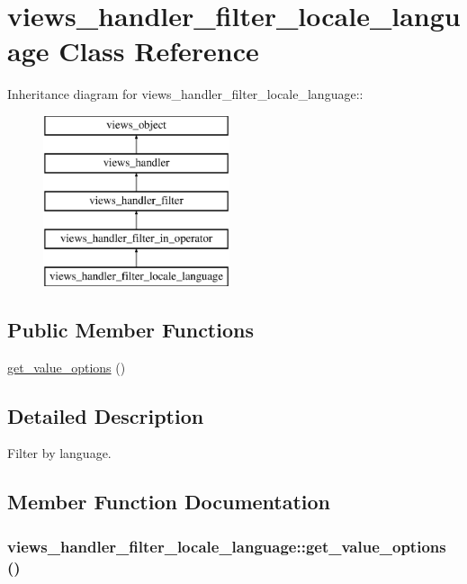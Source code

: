 \hypertarget{classviews__handler__filter__locale__language}{
\section{views\_\-handler\_\-filter\_\-locale\_\-language Class Reference}
\label{classviews__handler__filter__locale__language}
}
Inheritance diagram for views\_\-handler\_\-filter\_\-locale\_\-language::\begin{figure}[H]
\begin{center}
\leavevmode
\includegraphics[height=5cm]{classviews__handler__filter__locale__language}
\end{center}
\end{figure}
\subsection*{Public Member Functions}
\begin{CompactItemize}
\item 
\hyperlink{classviews__handler__filter__locale__language_ca1d25b19b4be6fa8e5745d15a0a07c1}{get\_\-value\_\-options} ()
\end{CompactItemize}


\subsection{Detailed Description}
Filter by language. 

\subsection{Member Function Documentation}
\hypertarget{classviews__handler__filter__locale__language_ca1d25b19b4be6fa8e5745d15a0a07c1}{
\subsubsection[{get\_\-value\_\-options}]{\setlength{\rightskip}{0pt plus 5cm}views\_\-handler\_\-filter\_\-locale\_\-language::get\_\-value\_\-options ()}}
\label{classviews__handler__filter__locale__language_ca1d25b19b4be6fa8e5745d15a0a07c1}


